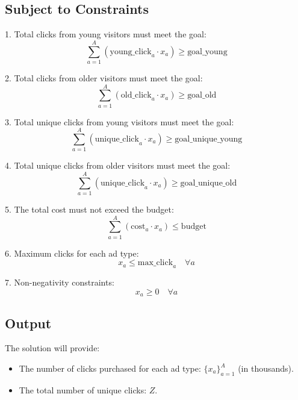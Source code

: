 \documentclass{article}
\begin{document}
\subsection*{Subject to Constraints}
1. Total clicks from young visitors must meet the goal:
\[
\sum_{a=1}^{A} \left( \text{young\_click}_a \cdot x_a \right) \geq \text{goal\_young}
\]

2. Total clicks from older visitors must meet the goal:
\[
\sum_{a=1}^{A} \left( \text{old\_click}_a \cdot x_a \right) \geq \text{goal\_old}
\]

3. Total unique clicks from young visitors must meet the goal:
\[
\sum_{a=1}^{A} \left( \text{unique\_click}_a \cdot x_a \right) \geq \text{goal\_unique\_young}
\]

4. Total unique clicks from older visitors must meet the goal:
\[
\sum_{a=1}^{A} \left( \text{unique\_click}_a \cdot x_a \right) \geq \text{goal\_unique\_old}
\]

5. The total cost must not exceed the budget:
\[
\sum_{a=1}^{A} \left( \text{cost}_a \cdot x_a \right) \leq \text{budget}
\]

6. Maximum clicks for each ad type:
\[
x_a \leq \text{max\_click}_a \quad \forall a
\]

7. Non-negativity constraints:
\[
x_a \geq 0 \quad \forall a
\]

\subsection*{Output}
The solution will provide:
\begin{itemize}
    \item The number of clicks purchased for each ad type: \( \{ x_a \}_{a=1}^{A} \) (in thousands).
    \item The total number of unique clicks: \( Z \).
\end{itemize}
\end{document}
